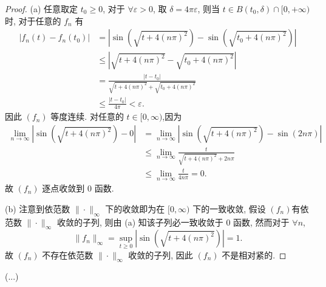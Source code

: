 \begin{proof}
    (a) 任意取定 $t_0\geq 0$, 对于 $\forall\varepsilon>0$,
    取 $\delta=4\pi\varepsilon$, 则当 $t\in B(t_0,\delta)\cap [0,+\infty)$ 时, 对于任意的 $f_n$ 有
    \begin{align*}
        |f_n(t)-f_n(t_0)| & =\left|\sin(\sqrt{t+4(n\pi)^2})-\sin(\sqrt{t_0+4(n\pi)^2})\right| \\
                        & \leq |\sqrt{t+4(n\pi)^2}-\sqrt{t_0+4(n\pi)^2}|\\
                        & =\frac{|t-t_0|}{\sqrt{t+4(n\pi)^2}+\sqrt{t_0+4(n\pi)^2}}\\
                        & \leq\frac{|t-t_0|}{4\pi}<\varepsilon.
    \end{align*}
    因此 $(f_n)$ 等度连续.
    对任意的 $t\in [0,\infty)$,因为
    \[\begin{split}
    \lim_{n\to\infty}|\sin(\sqrt{t+4(n\pi)^2})-0|&=\lim_{n\to\infty}|\sin(\sqrt{t+4(n\pi)^2})-\sin(2n\pi)|\\
    &\leq \lim_{n\to\infty}\frac{t}{\sqrt{t+4(n\pi)^2}+2n\pi}\\
    &\leq \lim_{n\to\infty}\frac{t}{4n\pi}=0.
    \end{split}\]
    故 $(f_n)$ 逐点收敛到 $0$ 函数.

    (b) 注意到依范数 $\|\cdot\|_{\infty}$ 下的收敛即为在 $[0,\infty)$ 下的一致收敛,
    假设 $(f_n)$有依范数 $\|\cdot\|_{\infty}$ 收敛的子列, 则由 (a) 知该子列必一致收敛于 $0$ 函数,
    然而对于 $\forall n$,
    \[\|f_n\|_{\infty}=\sup_{t\geq 0}|\sin(\sqrt{t+4(n\pi)^2})|=1.\]
    故 $(f_n)$ 不存在依范数 $\|\cdot\|_{\infty}$ 收敛的子列, 因此 $(f_n)$ 不是相对紧的.
\end{proof}


\begin{exercise}[7]
  (...)
\end{exercise}

